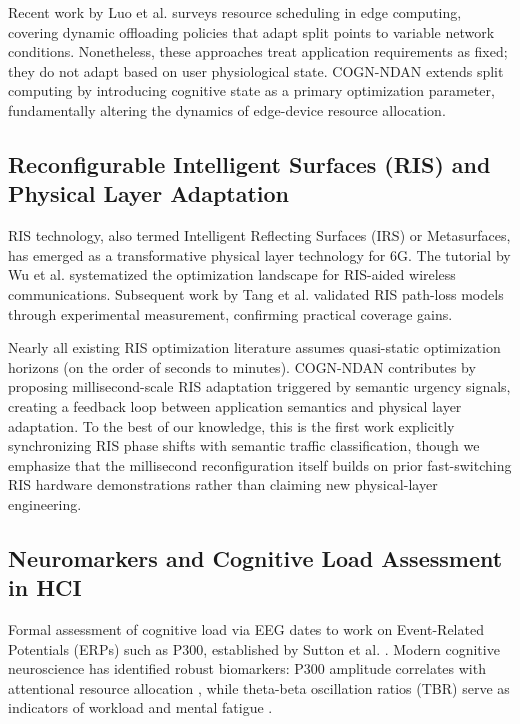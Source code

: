 \documentclass[journal]{IEEEtran}
\newcommand{\COGN}{COGN-NDAN}
\begin{document}
Recent work by Luo et al. \cite{luo2021resource} surveys resource scheduling in edge computing, covering dynamic offloading policies that adapt split points to variable network conditions. Nonetheless, these approaches treat application requirements as fixed; they do not adapt based on user physiological state. \COGN{} extends split computing by introducing cognitive state as a primary optimization parameter, fundamentally altering the dynamics of edge-device resource allocation.

\subsection{Reconfigurable Intelligent Surfaces (RIS) and Physical Layer Adaptation}
RIS technology, also termed Intelligent Reflecting Surfaces (IRS) or Metasurfaces, has emerged as a transformative physical layer technology for 6G. The tutorial by Wu et al. \cite{wu2021tutorial} systematized the optimization landscape for RIS-aided wireless communications. Subsequent work by Tang et al. \cite{tang2021ris} validated RIS path-loss models through experimental measurement, confirming practical coverage gains.

Nearly all existing RIS optimization literature assumes quasi-static optimization horizons (on the order of seconds to minutes). \COGN{} contributes by proposing millisecond-scale RIS adaptation triggered by semantic urgency signals, creating a feedback loop between application semantics and physical layer adaptation. To the best of our knowledge, this is the first work explicitly synchronizing RIS phase shifts with semantic traffic classification, though we emphasize that the millisecond reconfiguration itself builds on prior fast-switching RIS hardware demonstrations rather than claiming new physical-layer engineering.

\subsection{Neuromarkers and Cognitive Load Assessment in HCI}
Formal assessment of cognitive load via EEG dates to work on Event-Related Potentials (ERPs) such as P300, established by Sutton et al. \cite{sutton1965evoked}. Modern cognitive neuroscience has identified robust biomarkers: P300 amplitude correlates with attentional resource allocation \cite{polich2007}, while theta-beta oscillation ratios (TBR) serve as indicators of workload and mental fatigue \cite{klimesch2012alpha}.
\end{document}
